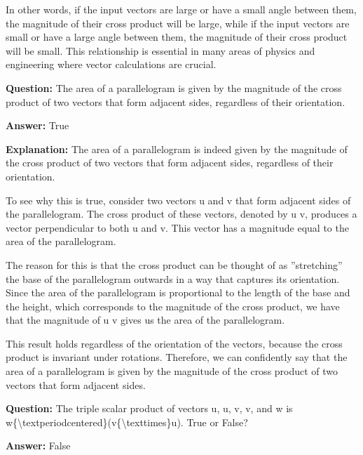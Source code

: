 \documentclass{article}
\begin{document}
In other words, if the input vectors are large or have a small angle between them, the magnitude of their cross product will be large, while if the input vectors are small or have a large angle between them, the magnitude of their cross product will be small. This relationship is essential in many areas of physics and engineering where vector calculations are crucial.
                
                \vspace{0.5cm} 
        
            
                \textbf {Question:} The area of a parallelogram is given by the magnitude of the cross product of two vectors that form adjacent sides, regardless of their orientation.
                
                \textbf{Answer:} True

                \textbf{Explanation:} The area of a parallelogram is indeed given by the magnitude of the cross product of two vectors that form adjacent sides, regardless of their orientation.

To see why this is true, consider two vectors u and v that form adjacent sides of the parallelogram. The cross product of these vectors, denoted by u {\texttimes} v, produces a vector perpendicular to both u and v. This vector has a magnitude equal to the area of the parallelogram.

The reason for this is that the cross product can be thought of as ''stretching'' the base of the parallelogram outwards in a way that captures its orientation. Since the area of the parallelogram is proportional to the length of the base and the height, which corresponds to the magnitude of the cross product, we have that the magnitude of u {\texttimes} v gives us the area of the parallelogram.

This result holds regardless of the orientation of the vectors, because the cross product is invariant under rotations. Therefore, we can confidently say that the area of a parallelogram is given by the magnitude of the cross product of two vectors that form adjacent sides.
                
                \vspace{0.5cm} 
        
            
                \textbf {Question:} The triple scalar product of vectors u, u, v, v, and w is w\{{\textbackslash}textperiodcentered\}(v\{{\textbackslash}texttimes\}u). True or False?
                
                \textbf{Answer:} False
\end{document}
